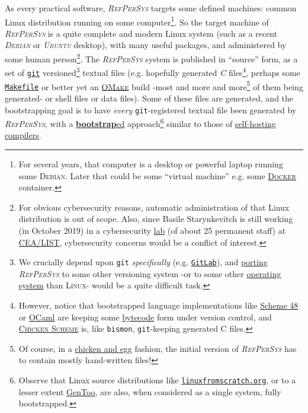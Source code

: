 \documentclass[11pt,a4paper,svgnames]{article}
\newcommand{\RefPerSys}{{\textit{\textsc{RefPerSys}}}}
\begin{document}
As every practical software, {\RefPerSys} targets some defined
machines: common Linux distribution running on some
computer\footnote{For several years, that computer is a desktop or
powerful laptop running some \textsc{Debian}. Later that could be some
``virtual machine'' e.g. some
\href{https://www.docker.com/}{\textsc{Docker}} container.}. So the
target machine of {\RefPerSys} is a quite complete and modern Linux
system (such as a recent \textit{\textsc{Debian}} or
\textit{\textsc{Ubuntu}} desktop), with many useful packages, and
administered by some human person\footnote{For obvious cybersecurity
reasons, automatic administration of that Linux distribution is out of
scope. Also, since Basile Starynkevitch is still working (in October
2019) in a cybersecurity
\href{http://www-list.cea.fr/en/technological-research/research-programmes/embedded-systems/validation-and-verification}{lab}
(of about 25 permanent staff) at
\href{http://www-list.cea.fr/}{CEA/LIST}, cybersecurity concerns would
be a conflict of interest.}. The {\RefPerSys} system is published in
``source'' form, as a set of \href{http://git-scm.com/}{\texttt{git}}
versioned\footnote{We crucially depend upon \texttt{git}
\emph{specifically} (e.g. \href{http://gitlab.org/}{\texttt{GitLab}}),
and \href{https://en.wikipedia.org/wiki/Porting}{porting} {\RefPerSys}
to some other versioning system -or to some other
\href{http://pages.cs.wisc.edu/~remzi/OSTEP/}{operating system} than
\textsc{Linux}- would be a quite difficult task.} textual files
(e.g. hopefully generated \textit{C} files\footnote{However, notice that
bootstrapped language implementations like
\href{http://s48.org/}{Scheme 48} or \href{https://ocaml.org/}{OCaml}
are keeping some
\href{https://en.wikipedia.org/wiki/Bytecode}{bytecode} form under
version control, and \href{https://www.call-cc.org/}{\textsc{Chicken
    Scheme}} is, like \texttt{bismon}, \texttt{git}-keeping generated
C files.}, perhaps some
\href{https://en.wikipedia.org/wiki/Makefile}{\texttt{Makefile}} or
better yet an
\href{http://projects.camlcity.org/projects/omake.html}{\textsc{OMake}}
build -most and more and more\footnote{Of course, in a
\href{https://en.wikipedia.org/wiki/Chicken_or_the_egg}{chicken and
  egg} fashion, the initial version of {\RefPerSys} has to contain
mostly hand-written files!} of them being generated- or shell files or
data files). Some of these files are generated, and the bootstrapping
goal is to have \emph{every} \texttt{git}-registered textual file been
generated by {\RefPerSys}, with a
\href{https://en.wikipedia.org/wiki/Bootstrapping\_(compilers)}{\textbf{bootstrap}ed}
approach\footnote{Observe that Linux source distributions like \href{http://www.linuxfromscratch.org/}{\texttt{linuxfromscratch.org}}, or to a lesser extent \href{https://www.gentoo.org/}{GenToo}, are also, when considered as a single system, fully bootstrapped.} similar to those of
\href{https://en.wikipedia.org/wiki/Self-hosting_(compilers)}{self-hosting
  compilers}.
\medskip
\end{document}
